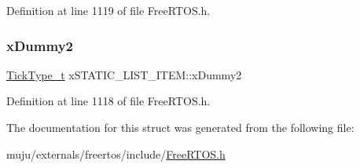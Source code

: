 Definition at line 1119 of file Free\+R\+T\+O\+S.\+h.

\mbox{\label{structx_s_t_a_t_i_c___l_i_s_t___i_t_e_m_a902f5a362987a85e76338f233e16817e}} 
\subsubsection{\texorpdfstring{x\+Dummy2}{xDummy2}}
{\footnotesize\ttfamily \hyperlink{externals_2freertos_2portable_2_g_c_c_2_a_r_m___c_m0_2portmacro_8h_aa69c48c6e902ce54f70886e6573c92a9}{Tick\+Type\+\_\+t} x\+S\+T\+A\+T\+I\+C\+\_\+\+L\+I\+S\+T\+\_\+\+I\+T\+E\+M\+::x\+Dummy2}



Definition at line 1118 of file Free\+R\+T\+O\+S.\+h.



The documentation for this struct was generated from the following file\+:\begin{DoxyCompactItemize}
\item 
muju/externals/freertos/include/\hyperlink{externals_2freertos_2include_2_free_r_t_o_s_8h}{Free\+R\+T\+O\+S.\+h}\end{DoxyCompactItemize}
